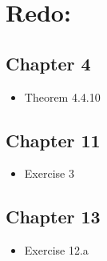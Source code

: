 \documentclass[a4paper, oneside]{book}
\begin{document}

\clearpage
\section{Redo:}
\subsection*{Chapter 4}
\begin{itemize}
\item Theorem 4.4.10
\end{itemize}
\subsection*{Chapter 11}
\begin{itemize}
\item Exercise 3
\end{itemize}
\subsection*{Chapter 13}
\begin{itemize}
\item Exercise 12.a
\end{itemize}









\end{document}
